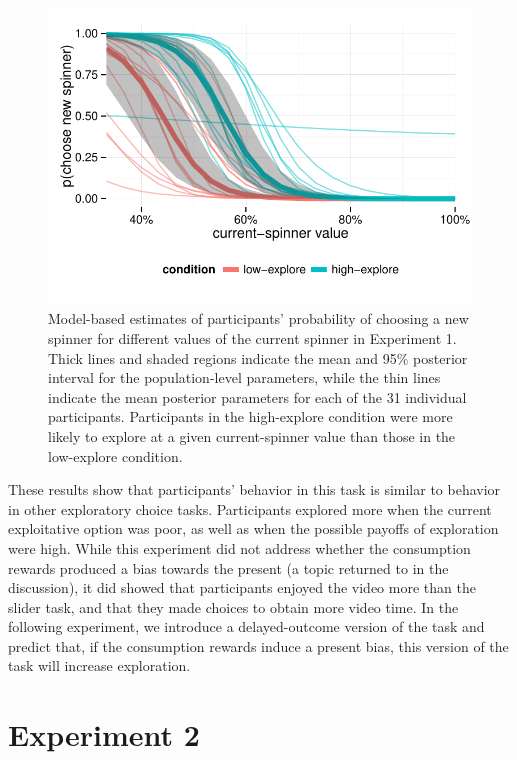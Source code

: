 \documentclass[10pt,letterpaper]{article}
\begin{document}
\begin{figure}
\centering
\includegraphics[width=\columnwidth]{figures/exp1results.pdf}
\caption{Model-based estimates of participants' probability of choosing a new
  spinner for different values of the current spinner in Experiment 1. Thick
  lines and shaded regions indicate the mean and 95\% posterior interval for the
  population-level parameters, while the thin lines indicate the mean posterior
  parameters for each of the 31 individual participants. Participants in the
  high-explore condition were more
  likely to explore at a given current-spinner value than those in the
  low-explore condition.}
\label{fig:exp1results}
\end{figure}

These results show that participants' behavior in this task is
similar to behavior in other exploratory choice tasks. Participants explored more
when the current exploitative option was poor, as well as when the possible
payoffs of exploration were high. While this experiment did not address whether the
consumption rewards produced a bias towards the present (a topic returned to in the
discussion), it did showed that participants enjoyed the video more than the slider
task, and that they made choices to obtain more video time. In the following
experiment, we introduce a delayed-outcome version of the task and predict that, if the
consumption rewards induce a present bias, this version of the task will increase exploration.

\section{Experiment 2}
\end{document}
